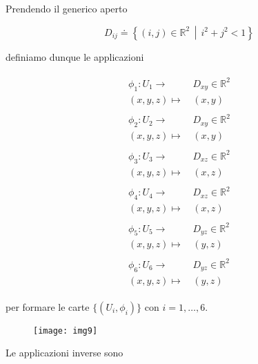 Prendendo il generico aperto

\begin{equation}
	D_{ij} \doteq \left\{ (i,j) \in \mathbb{R}^{2} \, \middle| \, i^{2}+j^{2}<1 \right\}
\end{equation}

definiamo dunque le applicazioni

\begin{align}
	\begin{split}
		\phi_{1} : U_{1} \to& \, D_{xy} \in \mathbb{R}^{2}\\
		(x,y,z) \mapsto& \, (x,y)\\\\
		\phi_{2} : U_{2} \to& \, D_{xy} \in \mathbb{R}^{2}\\
		(x,y,z) \mapsto& \, (x,y)\\\\
		\phi_{3} : U_{3} \to& \, D_{xz} \in \mathbb{R}^{2}\\
		(x,y,z) \mapsto& \, (x,z)\\\\
		\phi_{4} : U_{4} \to& \, D_{xz} \in \mathbb{R}^{2}\\
		(x,y,z) \mapsto& \, (x,z)\\\\
		\phi_{5} : U_{5} \to& \, D_{yz} \in \mathbb{R}^{2}\\
		(x,y,z) \mapsto& \, (y,z)\\\\
		\phi_{6} : U_{6} \to& \, D_{yz} \in \mathbb{R}^{2}\\
		(x,y,z) \mapsto& \, (y,z)
	\end{split}
\end{align}

per formare le carte $ \{(U_{i},\phi_{i})\} $ con $ i=1,\dots,6 $.

\begin{figure}[H]
	\centering
	\texttt{[image: img9]}
\end{figure}

Le applicazioni inverse sono

